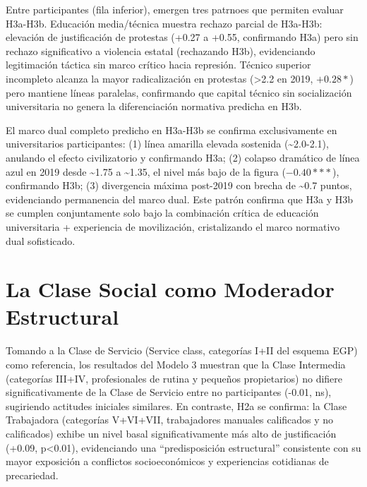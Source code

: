 \documentclass[
  13pt,
]{article}
\begin{document}
Entre participantes (fila inferior), emergen tres patrnoes que permiten
evaluar H3a-H3b. Educación media/técnica muestra rechazo parcial de
H3a-H3b: elevación de justificación de protestas (+0.27 a +0.55,
confirmando H3a) pero sin rechazo significativo a violencia estatal
(rechazando H3b), evidenciando legitimación táctica sin marco crítico
hacia represión. Técnico superior incompleto alcanza la mayor
radicalización en protestas (\textgreater2.2 en 2019, \(+0.28*\)) pero
mantiene líneas paralelas, confirmando que capital técnico sin
socialización universitaria no genera la diferenciación normativa
predicha en H3b.

El marco dual completo predicho en H3a-H3b se confirma exclusivamente en
universitarios participantes: (1) línea amarilla elevada sostenida
(\textasciitilde2.0-2.1), anulando el efecto civilizatorio y confirmando
H3a; (2) colapso dramático de línea azul en 2019 desde
\textasciitilde1.75 a \textasciitilde1.35, el nivel más bajo de la
figura (\(-0.40***\)), confirmando H3b; (3) divergencia máxima post-2019
con brecha de \textasciitilde0.7 puntos, evidenciando permanencia del
marco dual. Este patrón confirma que H3a y H3b se cumplen conjuntamente
solo bajo la combinación crítica de educación universitaria +
experiencia de movilización, cristalizando el marco normativo dual
sofisticado.

\section{La Clase Social como Moderador
Estructural}\label{la-clase-social-como-moderador-estructural}

Tomando a la Clase de Servicio (Service class, categorías I+II del
esquema EGP) como referencia, los resultados del Modelo 3 muestran que
la Clase Intermedia (categorías III+IV, profesionales de rutina y
pequeños propietarios) no difiere significativamente de la Clase de
Servicio entre no participantes (-0.01, ns), sugiriendo actitudes
iniciales similares. En contraste, H2a se confirma: la Clase Trabajadora
(categorías V+VI+VII, trabajadores manuales calificados y no
calificados) exhibe un nivel basal significativamente más alto de
justificación (+0.09, p\textless0.01), evidenciando una ``predisposición
estructural'' consistente con su mayor exposición a conflictos
socioeconómicos y experiencias cotidianas de precariedad.
\end{document}
